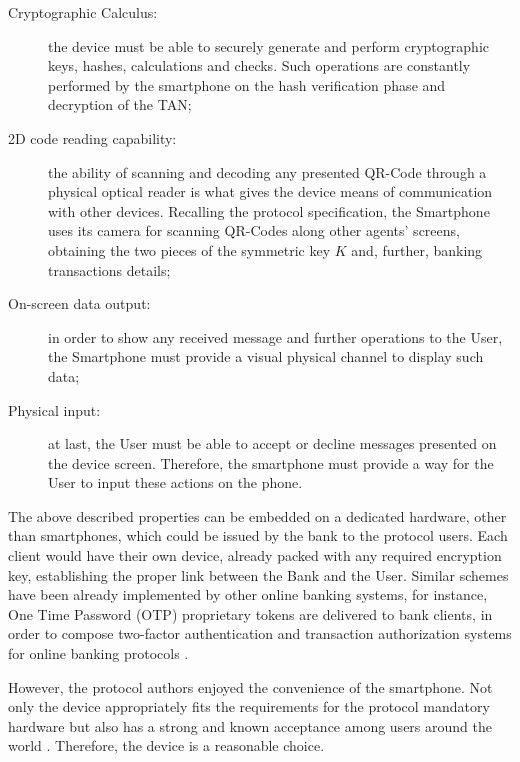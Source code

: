 \begin{description}
  \item[Cryptographic Calculus:] the device must be able to securely generate and perform cryptographic keys, hashes, calculations and checks. Such operations are constantly performed by the smartphone on the hash verification phase and decryption of the TAN;

  \item[2D code reading capability:] the ability of scanning and decoding any presented QR-Code through a physical optical reader is what gives the device means of communication with other devices. Recalling the protocol specification, the Smartphone uses its camera for scanning QR-Codes along other agents' screens, obtaining the two pieces of the symmetric key $K$ and, further, banking transactions details;

  \item[On-screen data output:] in order to show any received message and further operations to the User, the Smartphone must provide a visual physical channel to display such data;

  \item[Physical input:] at last, the User must be able to accept or decline messages presented on the device screen. Therefore, the smartphone must provide a way for the User to input these actions on the phone.
\end{description}

The above described properties can be embedded on a dedicated hardware, other than smartphones, which could be issued by the bank to the protocol users. Each client would have their own device, already packed with any required encryption key, establishing the proper link between the Bank and the User. Similar schemes have been already implemented by other online banking systems, for instance, One Time Password (OTP) proprietary tokens are delivered to bank clients, in order to compose two-factor authentication and transaction authorization systems for online banking protocols \cite{Bonneau2012, Claessens2002}.

However, the protocol authors enjoyed the convenience of the smartphone. Not only the device appropriately fits the requirements for the protocol mandatory hardware but also has a strong and known acceptance among users around the world \cite{NewzooReport2018}. Therefore, the device is a reasonable choice.




